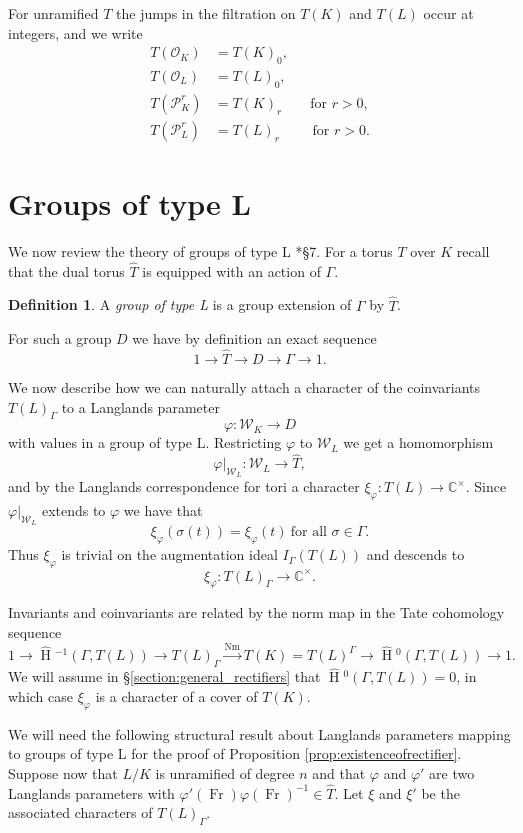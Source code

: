 \documentclass{compositio}
\theoremstyle{plain}
\newcommand{\HT}[1]{\hat{\HH}{}^{#1}}
\theoremstyle{definition}
\newtheorem{definition}[theorem]{Definition}
\numberwithin{equation}{section}
\DeclareMathOperator{\HH}{H}
\DeclareMathOperator{\Nm}{Nm}
\DeclareMathOperator{\Fr}{Fr}
\newcommand{\CCx}{\mathbb{C}^\times}
\newcommand{\OK}{\mathcal{O}_K}
\newcommand{\PK}{\mathcal{P}_K}
\newcommand{\PL}{\mathcal{P}_L}
\newcommand{\OL}{\mathcal{O}_L}
\newcommand{\Weil}{\mathcal{W}}
\begin{document}
For unramified $T$ the jumps in the filtration on $T(K)$ and $T(L)$ occur at integers, and we write
\begin{align*}
T(\OK) &= T(K)_0, \\
T(\OL) &= T(L)_0, \\
T(\PK^r) &= T(K)_r\qquad \mbox{for $r > 0$}, \\
T(\PL^r) &= T(L)_r\qquad\,\,\mbox{for $r > 0$}.
\end{align*}

\section{Groups of type L} \label{section:groups_of_type_L}

We now review the theory of groups of type L \cite{roe:13a}*{\S 7}.
For a torus $T$ over $K$ recall that the dual torus $\hat{T}$ is equipped with
an action of $\Gamma$.

\begin{definition}
A \emph{group of type L} is a group extension of $\Gamma$ by $\hat{T}$.
\end{definition}

For such a group $D$ we have by definition an exact sequence
$$1 \rightarrow \hat{T} \rightarrow D \rightarrow \Gamma \rightarrow 1.$$

We now describe how we can naturally attach a character of the coinvariants
$T(L)_{\Gamma}$ to a Langlands parameter
$$\varphi : \Weil_K \rightarrow D$$
with values in a group of type L.
Restricting $\varphi$ to $\Weil_L$ we get a homomorphism
$$\varphi|_{\Weil_L} : \Weil_L \rightarrow \hat{T},$$
and by the Langlands correspondence for tori a character
$\xi_{\varphi} : T(L) \rightarrow \CCx$.  Since $\varphi|_{\Weil_L}$ extends
to $\varphi$ we have that
$$\xi_{\varphi}(\sigma(t)) = \xi_{\varphi}(t)\ \mbox{for all $\sigma \in \Gamma$.}$$
Thus $\xi_{\varphi}$ is trivial on the augmentation ideal $I_{\Gamma}(T(L))$
and descends to $$\xi_{\varphi} : T(L)_\Gamma \rightarrow \CCx.$$

Invariants
and coinvariants are related by the norm map
in the Tate cohomology sequence
$$1 \rightarrow \HT{-1}(\Gamma,T(L)) \rightarrow T(L)_{\Gamma} \xrightarrow{\Nm} T(K)
  = T(L)^{\Gamma} \rightarrow \HT{0}(\Gamma,T(L)) \rightarrow 1.$$
We will assume in \S \ref{section:general_rectifiers} that $\HT{0}(\Gamma,T(L)) = 0$, in which case
$\xi_\varphi$ is a character of a cover of $T(K)$.

We will need the following structural result about Langlands
parameters mapping to groups of type L for the proof of
Proposition \ref{prop:existenceofrectifier}.  Suppose now that $L/K$ is unramified of degree $n$ and that
$\varphi$ and $\varphi'$ are two Langlands parameters
with $\varphi'(\Fr) \varphi(\Fr)^{-1} \in \hat{T}$.
Let $\xi$ and $\xi'$ be the associated characters of $T(L)_{\Gamma}$.
\end{document}
